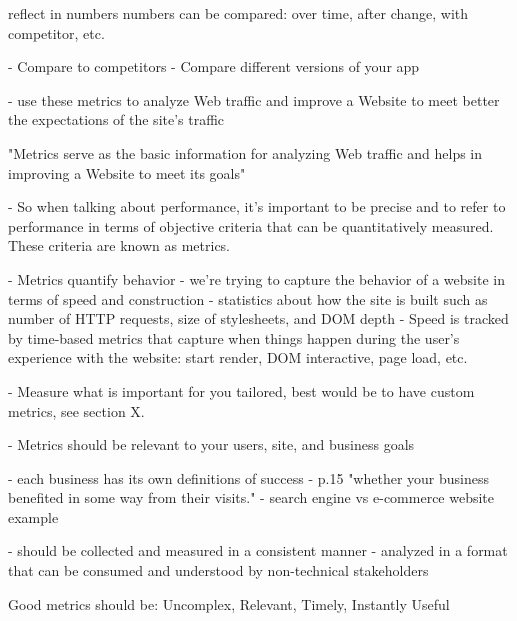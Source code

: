 reflect in numbers
numbers can be compared: over time, after change, with competitor, etc.

- Compare to competitors
- Compare different versions of your app

- use these metrics to analyze Web traffic and improve a Website to meet better the expectations of the site’s traffic

"Metrics serve as the basic information for analyzing Web traffic and helps in improving a Website to meet its goals"


- So when talking about performance, it's important to be precise and to refer to performance in terms of objective criteria that can be quantitatively measured. These criteria are known as metrics.

- Metrics quantify behavior
- we're trying to capture the behavior of a website in terms of speed and construction
- statistics about how the site is built such as number of HTTP requests, size of stylesheets, and DOM depth
- Speed is tracked by time-based metrics that capture when things happen during the user's experience with the website: start render, DOM interactive, page load, etc. 




- Measure what is important for you
tailored, best would be to have custom metrics, see section X.

- Metrics should be relevant to your users, site, and business goals

- each business has its own definitions of success
- p.15 "whether your business benefited in some way from their visits."
- search engine vs e-commerce website example




- should be collected and measured in a consistent manner
- analyzed in a format that can be consumed and understood by non-technical stakeholders

 Good metrics should be: Uncomplex, Relevant, Timely, Instantly Useful
 

